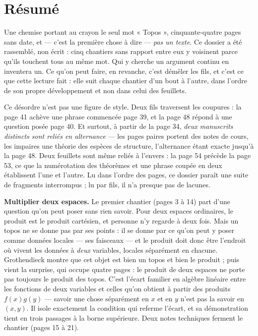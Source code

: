 \documentclass[11pt,a4paper]{article}
\begin{document}
\section*{Résumé}

\begin{resume}
Une chemise portant au crayon le seul mot « Topos », cinquante-quatre pages
sans date, et — c'est la première chose à dire — \emph{pas un texte}. Ce
dossier a été rassemblé, non écrit : cinq chantiers sans rapport entre eux y
voisinent parce qu'ils touchent tous au même mot. Qui y cherche un argument
continu en inventera un. Ce qu'on peut faire, en revanche, c'est démêler les
fils, et c'est ce que cette lecture fait : elle suit chaque chantier d'un bout
à l'autre, dans l'ordre de son propre développement et non dans celui des
feuillets.

Ce désordre n'est pas une figure de style. Deux fils traversent les coupures :
la page 41 achève une phrase commencée page 39, et la page 48 répond à une
question posée page 40. Et surtout, à partir de la page 34, \emph{deux
manuscrits distincts sont reliés en alternance} — les pages paires portent des
notes de cours, les impaires une théorie des espèces de structure, l'alternance
étant exacte jusqu'à la page 48. Deux feuillets sont même reliés à l'envers :
la page 54 précède la page 53, ce que la numérotation des théorèmes et une
phrase coupée en deux établissent l'une et l'autre. Lu dans l'ordre des pages,
ce dossier paraît une suite de fragments interrompus ; lu par fils, il n'a
presque pas de lacunes.


\textbf{Multiplier deux espaces.} Le premier chantier (pages 3 à 14) part
d'une question qu'on peut poser sans rien savoir. Pour deux espaces
ordinaires, le produit est le produit cartésien, et personne n'y regarde à deux
fois. Mais un topos ne se donne pas par ses points : il se donne par ce qu'on
peut y poser comme données locales — ses faisceaux — et le produit doit donc
être l'endroit où vivent les données à \emph{deux} variables, locales
séparément en chacune. Grothendieck montre que cet objet est bien un topos et
bien le produit ; puis vient la surprise, qui occupe quatre pages : le produit
de deux espaces ne porte pas toujours le produit des topos. C'est l'écart
familier en algèbre linéaire entre les fonctions de deux variables et celles
qu'on obtient à partir des produits $f(x)g(y)$ — savoir une chose séparément en
$x$ et en $y$ n'est pas la savoir en $(x,y)$. Il isole exactement la condition
qui referme l'écart, et sa démonstration tient en trois passages à la borne
supérieure. Deux notes techniques ferment le chantier (pages 15 à 21).


\end{resume}
\end{document}
